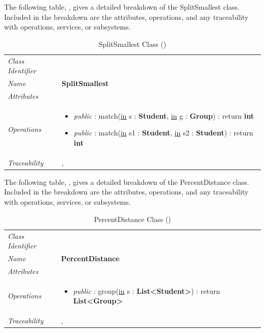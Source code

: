 \documentclass[12pt,letterpaper]{article}
\begin{document}
The following table, , gives a detailed breakdown of the SplitSmallest class. Included in the breakdown are the attributes, operations, and any traceability with operations, services, or subsystems.

\begin{table}[H]
    \caption{SplitSmallest Class ()} 
	\begin{tabu} to 
		\toprule
		Class Identifier &  \\
		Name & {\bf SplitSmallest} \\
		Attributes & \\

		Operations &
		\begin{minipage}[t]{\linewidth}
			\begin{itemize}
			    \item {\it public} : match(\underline{in} s : {\bf Student}, \underline{in} g : {\bf Group}) : return {\bf int}
			    \item {\it public} : match(\underline{in} s1 : {\bf Student}, \underline{in} s2 : {\bf Student}) : return {\bf int}
	        \end{itemize}
	    \end{minipage} \\
	    	Traceability & , \\
		\toprule
	\end{tabu}
\end{table}

The following table, , gives a detailed breakdown of the PercentDistance class. Included in the breakdown are the attributes, operations, and any traceability with operations, services, or subsystems.

\begin{table}[H]
    \caption{PercentDistance Class ()} 
	\begin{tabu} to 
		\toprule
		Class Identifier &  \\
		Name & {\bf PercentDistance} \\
		Attributes & \\

		Operations &
		\begin{minipage}[t]{\linewidth}
			\begin{itemize}
			    \item {\it public} : group(\underline{in} s : {\bf List<Student>}) : return {\bf List<Group>}
	        \end{itemize}
	    \end{minipage} \\
	    	Traceability & , \\
		\toprule
	\end{tabu}
\end{table}
\end{document}
